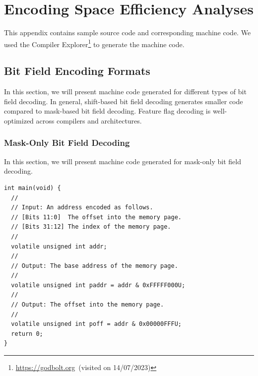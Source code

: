 \appendix

\FloatBarrier
\chapter{Encoding Space Efficiency Analyses}

This appendix contains sample source code and corresponding machine code. We used the Compiler Explorer\footnote{\url{https://godbolt.org}~(visited on 14/07/2023)} to generate the machine code.

\FloatBarrier
\section{Bit Field Encoding Formats}

In this section, we will present machine code generated for different types of bit field decoding. In general, shift-based bit field decoding generates smaller code compared to mask-based bit field decoding. Feature flag decoding is well-optimized across compilers and architectures.

\FloatBarrier
\subsection{Mask-Only Bit Field Decoding}
\label{sec:mask_dec}

In this section, we will present machine code generated for mask-only bit field decoding.

\begin{lstfloat}[!htb]
  \centering
  \caption{Mask-Only Bit Field Decoding.}
  \label{lst:mask_dec}
  \begin{lstlisting}[style=c]
int main(void) {
  //
  // Input: An address encoded as follows.
  // [Bits 11:0]  The offset into the memory page.
  // [Bits 31:12] The index of the memory page.
  //
  volatile unsigned int addr;
  //
  // Output: The base address of the memory page.
  //
  volatile unsigned int paddr = addr & 0xFFFFF000U;
  //
  // Output: The offset into the memory page.
  //
  volatile unsigned int poff = addr & 0x00000FFFU;
  return 0;
}
  \end{lstlisting}
\end{lstfloat}


